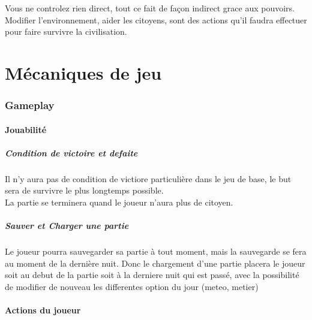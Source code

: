 \documentclass[a4paper]{article}
\begin{document}
			Vous ne controlez rien direct, tout ce fait de façon indirect grace aux pouvoirs. Modifier l'environnement, aider les citoyens, sont des actions qu'il faudra effectuer pour faire survivre la civilisation.


  \newpage
  \part{Mécaniques de jeu}
    \section{Gameplay}
      \subsection{Jouabilité}
		\subsubsection{Condition de victoire et defaite}
			Il n'y aura pas de condition de victiore particulière dans le jeu de base, le but sera de survivre le plus longtemps possible.\\
			La partie se terminera quand le joueur n'aura plus de citoyen.
		\subsubsection{Sauver et Charger une partie}
			Le joueur pourra sauvegarder sa partie à tout moment, mais la sauvegarde se fera au moment de la dernière nuit.
			Donc le chargement d'une partie placera le joueur soit au debut de la partie soit à la derniere nuit qui est passé, avec la possibilité de modifier de nouveau les differentes option du jour (meteo, metier)


	\subsection{Actions du joueur}
\end{document}
